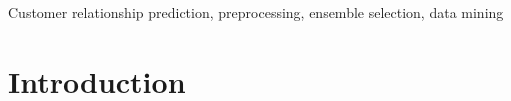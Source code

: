 \documentclass[journal]{IEEEtran}
\begin{document}
\begin{IEEEkeywords}
Customer relationship prediction, preprocessing, ensemble selection,
data mining
\end{IEEEkeywords}






%
\IEEEpeerreviewmaketitle



\section{Introduction}
%
%
%
%





\end{document}
